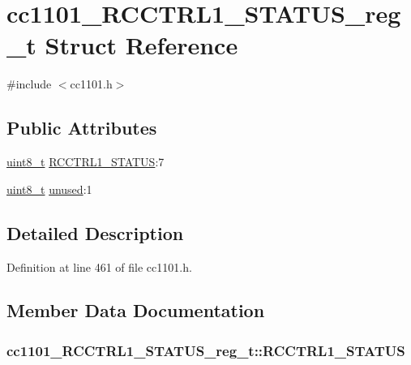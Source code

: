 \hypertarget{structcc1101___r_c_c_t_r_l1___s_t_a_t_u_s__reg__t}{}\section{cc1101\+\_\+\+R\+C\+C\+T\+R\+L1\+\_\+\+S\+T\+A\+T\+U\+S\+\_\+reg\+\_\+t Struct Reference}
\label{structcc1101___r_c_c_t_r_l1___s_t_a_t_u_s__reg__t}


{\ttfamily \#include $<$cc1101.\+h$>$}

\subsection*{Public Attributes}
\begin{DoxyCompactItemize}
\item 
\hyperlink{_p_e___types_8h_aba7bc1797add20fe3efdf37ced1182c5}{uint8\+\_\+t} \hyperlink{structcc1101___r_c_c_t_r_l1___s_t_a_t_u_s__reg__t_ad66ea5e457d5bca1b26d1da283c28ed2}{R\+C\+C\+T\+R\+L1\+\_\+\+S\+T\+A\+T\+US}\+:7
\item 
\hyperlink{_p_e___types_8h_aba7bc1797add20fe3efdf37ced1182c5}{uint8\+\_\+t} \hyperlink{structcc1101___r_c_c_t_r_l1___s_t_a_t_u_s__reg__t_a4c74e9e6e422838175a25e5fb03dbdca}{unused}\+:1
\end{DoxyCompactItemize}


\subsection{Detailed Description}


Definition at line 461 of file cc1101.\+h.



\subsection{Member Data Documentation}
\subsubsection[{\texorpdfstring{R\+C\+C\+T\+R\+L1\+\_\+\+S\+T\+A\+T\+US}{RCCTRL1_STATUS}}]{ cc1101\+\_\+\+R\+C\+C\+T\+R\+L1\+\_\+\+S\+T\+A\+T\+U\+S\+\_\+reg\+\_\+t\+::\+R\+C\+C\+T\+R\+L1\+\_\+\+S\+T\+A\+T\+US}\hypertarget{structcc1101___r_c_c_t_r_l1___s_t_a_t_u_s__reg__t_ad66ea5e457d5bca1b26d1da283c28ed2}{}\label{structcc1101___r_c_c_t_r_l1___s_t_a_t_u_s__reg__t_ad66ea5e457d5bca1b26d1da283c28ed2}


